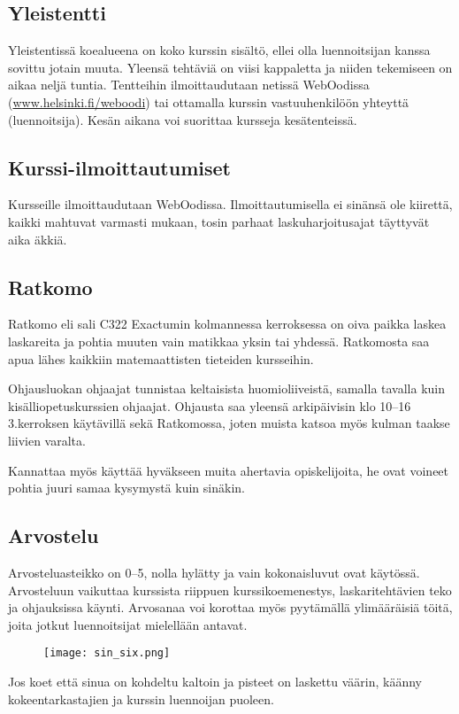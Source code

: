 \documentclass[../ala_hataile.tex]{subfiles}
\begin{document}
	\subsection*{Yleistentti}
	Yleistentissä koealueena on koko kurssin
	sisältö, ellei olla luennoitsijan kanssa
	sovittu jotain muuta. Yleensä tehtäviä on
	viisi kappaletta ja niiden tekemiseen on aikaa
	neljä tuntia. Tentteihin ilmoittaudutaan
	netissä Web\-Oodissa (\url{www.helsinki.fi/weboodi})
	tai ottamalla kurssin vastuuhenkilöön
	yhteyttä (luennoitsija). Kesän aikana
	voi suorittaa kursseja kesätenteissä.
	\subsection*{Kurssi-ilmoittautumiset}
	Kursseille ilmoittaudutaan WebOodissa.
	Ilmoittautumisella ei sinänsä ole kiirettä,
	kaikki mahtuvat varmasti mukaan, tosin
	parhaat laskuharjoitusajat täyttyvät aika
	äkkiä.
	\subsection*{Ratkomo}
	Ratkomo eli sali C322 Exactumin kolmannessa kerroksessa 
	on oiva paikka laskea laskareita
	ja pohtia muuten vain matikkaa yksin tai
	yhdessä. Ratkomosta saa apua lähes kaikkiin
	matemaattisten tieteiden kursseihin.
	
	Ohjausluokan ohjaajat tunnistaa keltaisista
	huomioliiveistä, samalla tavalla kuin
	kisälliopetuskurssien ohjaajat. Ohjausta
	saa yleensä arkipäivisin klo 10--16 3.kerroksen
	käytävillä sekä Ratkomossa, joten muista
	katsoa myös kulman taakse liivien varalta.
	
	Kannattaa myös käyttää hyväkseen muita
	ahertavia opiskelijoita, he ovat voineet
	pohtia juuri samaa kysymystä kuin sinäkin.
	
	\subsection*{Arvostelu}
	Arvosteluasteikko on 0--5, nolla hylätty
	ja vain kokonaisluvut ovat käytössä.
	Arvosteluun vaikuttaa kurssista riippuen
	kurssikoemenestys, laskaritehtävien teko
	ja ohjauksissa käynti. Arvosanaa voi korottaa
	myös pyytämällä ylimääräisiä töitä, joita jotkut luennoitsijat mielellään antavat.
	\begin{figure}
		\centering
		\texttt{[image: sin\_six.png]}
	\end{figure}
	
	Jos koet että sinua on
	kohdeltu kaltoin ja pisteet on laskettu väärin,
	käänny kokeentarkastajien ja kurssin
	luennoijan puoleen.
\end{document}
